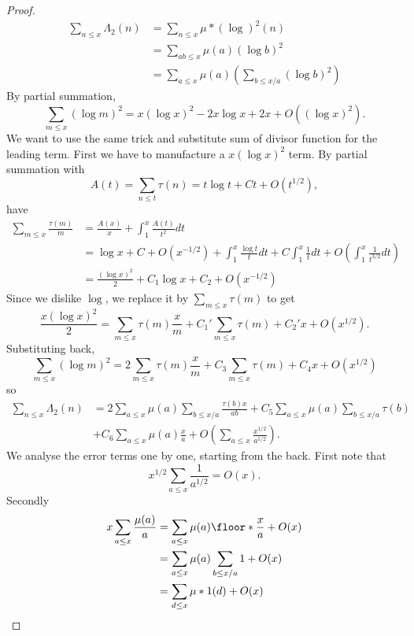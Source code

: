 \documentclass[a4paper]{article}
\begin{document}
\begin{proof}
  \begin{align*}
    \sum_{n \leq x} \Lambda_2(n)
    &= \sum_{n \leq x} \mu * (\log)^2 (n) \\
    &= \sum_{ab \leq x} \mu(a) (\log b)^2 \\
    &= \sum_{a \leq x} \mu(a) \left( \sum_{b \leq x/a} (\log b)^2 \right)
  \end{align*}
  By partial summation,
  \[
    \sum_{m \leq x} (\log m)^2
    = x (\log x)^2 - 2x \log x + 2x + O((\log x)^2).
  \]
  We want to use the same trick and substitute sum of divisor function for the leading term. First we have to manufacture a \(x (\log x)^2\) term. By partial summation with
  \[
    A(t) = \sum_{n \leq t} \tau(n) = t \log t + Ct + O(t^{1/2}),
  \]
  have
  \begin{align*}
    \sum_{m \leq x} \frac{\tau(m)}{m}
    &= \frac{A(x)}{x} + \int_1^x \frac{A(t)}{t^2} dt \\
    &= \log x + C + O(x^{-1/2}) + \int_1^x \frac{\log t}{t} dt + C \int_1^x \frac{1}{t} dt + O(\int_1^x \frac{1}{t^{3/2}} dt) \\
    &= \frac{(\log x)^2}{2} + C_1 \log x + C_2 + O(x^{-1/2})
  \end{align*}
  Since we dislike \(\log\), we replace it by \(\sum_{m \leq x} \tau(m)\) to get
  \[
    \frac{x (\log x)^2}{2}
    = \sum_{m \leq x} \tau(m) \frac{x}{m} + C_1' \sum_{m \leq x} \tau(m) + C_2'x + O(x^{1/2}).
  \]
  Substituting back,
  \[
    \sum_{m \leq x} (\log m)^2
    = 2 \sum_{m \leq x} \tau(m) \frac{x}{m} + C_3 \sum_{m \leq x} \tau(m) + C_4 x + O(x^{1/2})
  \]
  so
  \begin{align*}
    \sum_{n \leq x} \Lambda_2(n)
    &= 2 \sum_{a \leq x} \mu(a) \sum_{b \leq x/a} \frac{\tau(b)x}{ab} + C_5 \sum_{a \leq x} \mu(a) \sum_{b \leq x/a} \tau(b) \\
    &+ C_6 \sum_{a \leq x} \mu(a) \frac{x}{a} + O(\sum_{a \leq x} \frac{x^{1/2}}{a^{1/2}}).
  \end{align*}
  We analyse the error terms one by one, starting from the back. First note that
  \[
    x^{1/2} \sum_{a \leq x} \frac{1}{a^{1/2}} = O(x).
  \]
  Secondly
  \begin{align*}
    x \sum_{a \leq x} \frac{\mu(a)}{a}
    &= \sum_{a \leq x} \mu(a) \floor*{\frac{x}{a}} + O(x) \\
    &= \sum_{a \leq x} \mu(a) \sum_{b \leq x/a} 1 + O(x) \\
    &= \sum_{d \leq x} \mu * 1(d) + O(x) \\

\end{align*}
\end{proof}
\end{document}

